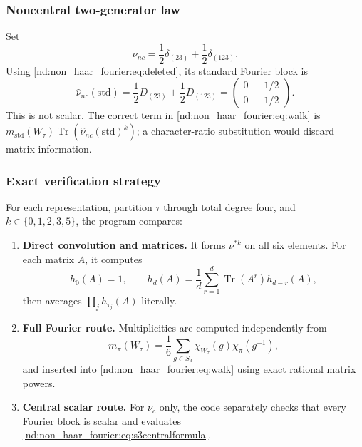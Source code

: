 \documentclass[10pt]{article}
\newcommand{\Tr}{\operatorname{Tr}}
\begin{document}
\subsubsection{Noncentral two-generator law}
Set
\begin{equation}\label{nd:non_haar_fourier:eq:noncentralstep}
 \nu_{nc}=\frac12\delta_{(23)}+\frac12\delta_{(123)}.
\end{equation}
Using \eqref{nd:non_haar_fourier:eq:deleted}, its standard Fourier block is
\begin{equation}\label{nd:non_haar_fourier:eq:noncentralmatrix}
 \widehat\nu_{nc}(\mathrm{std})
 =\frac12D_{(23)}+\frac12D_{(123)}
 =\begin{pmatrix}0&-1/2\\0&-1/2\end{pmatrix}.
\end{equation}
This is not scalar.  The correct term in \eqref{nd:non_haar_fourier:eq:walk} is
$m_{\mathrm{std}}(W_\tau)\Tr(\widehat\nu_{nc}(\mathrm{std})^k)$;
a character-ratio substitution would discard matrix information.

\subsubsection{Exact verification strategy}
For each representation, partition $\tau$ through total degree four, and
$k\in\{0,1,2,3,5\}$, the program compares:
\begin{enumerate}
\item \textbf{Direct convolution and matrices.}  It forms $\nu^{*k}$ on all
six elements.  For each matrix $A$, it computes
\begin{equation}\label{nd:non_haar_fourier:eq:newton}
 h_0(A)=1,\qquad h_d(A)=\frac1d\sum_{r=1}^d
 \Tr(A^r)h_{d-r}(A),
\end{equation}
then averages $\prod_jh_{\tau_j}(A)$ literally.
\item \textbf{Full Fourier route.}  Multiplicities are computed independently
from
\begin{equation}\label{nd:non_haar_fourier:eq:multiplicity}
 m_\pi(W_\tau)=\frac1{6}\sum_{g\in S_3}
 \chi_{W_\tau}(g)\chi_\pi(g^{-1}),
\end{equation}
and inserted into \eqref{nd:non_haar_fourier:eq:walk} using exact rational matrix powers.
\item \textbf{Central scalar route.}  For $\nu_c$ only, the code separately
checks that every Fourier block is scalar and evaluates
\eqref{nd:non_haar_fourier:eq:s3centralformula}.
\end{enumerate}
\end{document}
